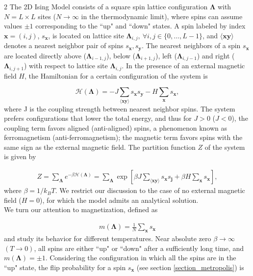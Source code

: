 \documentclass{article}
\begin{document}
\begin{multicols}{2}
The 2D Ising Model consists of a square spin lattice configuration $\bm{\Lambda}$ with $N =L\times L$ sites ($N \to \infty$ in the thermodynamic limit), where spins can assume values $\pm 1$ corresponding to the ``up" and ``down" states. A spin labeled by index $\mathbf{x}=(i,j)$, $s_{\mathbf{x}}$, is located on lattice site $\boldsymbol{\Lambda}_{i,j}, \ \forall i,j \in\{0,\dots,L-1\}$, and $\langle \mathbf{xy} \rangle$ denotes a nearest neighbor pair of spins $s_{\mathbf{x}},s_{\mathbf{y}}$. The nearest neighbors of a spin $s_{\mathbf{x}}$ are located directly above ($\boldsymbol{\Lambda}_{i-1,j}$), below ($\boldsymbol{\Lambda}_{i+1,j}$), left ($\boldsymbol{\Lambda}_{i,j-1}$) and right ($\boldsymbol{\Lambda}_{i,j+1}$) with respect to lattice site $\boldsymbol{\Lambda}_{i,j}$. In the presence of an external magnetic field $H$, the Hamiltonian for a certain configuration of the system is

\begin{equation}
    \mathcal{H}(\boldsymbol{\Lambda}) = -J\sum_{\langle \mathbf{xy}\rangle} s_{\mathbf{x}}s_\mathbf{y} - H\sum_{\mathbf{x}}{s_{\mathbf{x}}},
    \label{hamiltonian}
\end{equation}
%
where J is the coupling strength between nearest neighbor spins. The system prefers configurations that lower the total energy, and thus for $J>0$ ($J<0$), the coupling term favors aligned (anti-aligned) spins, a phenomenon known as ferromagnetism (anti-ferromagnetism); the magnetic term favors spins with the same sign as the external magnetic field. The partition function $Z$ of the system is given by

\begin{align}
    Z = \sum_{\boldsymbol{\Lambda}}e^{-\beta\mathcal{H}(\boldsymbol{\Lambda})} = 
    \sum_{\boldsymbol{\Lambda}}\exp\left[ \beta J\sum_{\langle \mathbf{xy} \rangle} s_{\mathbf{x}}s_{\mathbf{j}} + \beta H\sum_{\mathbf{x}}{s_\mathbf{x}}  \right],
\end{align}
%
where $\beta = 1/k_BT$. We restrict our discussion to the case of no external magnetic field ($H=0$), for which the model admits an analytical solution.\\

We turn our attention to magnetization, defined as

\begin{align}
    m(\boldsymbol{\Lambda}) = \frac{1}{N}\sum_{\mathbf{x}}
s_{\mathbf{x}} \end{align}
%
and study its behavior for different temperatures. Near absolute zero $\beta \to \infty$ $(T \to 0)$, all spins are either ``up" or ``down" after a sufficiently long time, and $m(\boldsymbol{\Lambda}) = \pm1$. Considering the configuration in which all the spins are in the ``up" state, the flip probability for a spin $s_{\mathbf{x}}$ (see section \ref{section_metropolis}) is 


\end{multicols}
\end{document}
